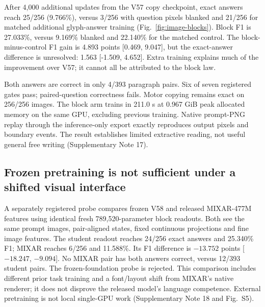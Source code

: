 After 4,000 additional updates from the V57 copy checkpoint, exact answers
reach 25/256 (9.766\%), versus 3/256 with question pixels blanked and 21/256
for matched additional glyph-answer training (Fig.~\ref{fig:image-blocks}).
Block F1 is 27.033\%, versus 9.169\% blanked and 22.140\% for the matched
control. The block-minus-control F1 gain is 4.893 points [0.469, 9.047],
but the exact-answer difference is unresolved: 1.563 [-1.509, 4.652].
Extra training explains much of the improvement over V57; it cannot all be
attributed to the block law.

Both answers are correct in only 4/393 paragraph pairs. Six of seven
registered gates pass; paired-question correctness fails. Motor copying
remains exact on 256/256 images. The block arm trains in 211.0 s at
0.967 GiB peak allocated memory on the same GPU, excluding previous training.
Native prompt-PNG replay through the inference-only export exactly reproduces
output pixels and boundary events. The result establishes limited extractive
reading, not useful general free writing (Supplementary Note 17).


\subsection*{Frozen pretraining is not sufficient under a shifted visual interface}
A separately registered probe compares frozen V58 and released MIXAR-477M\cite{mixar}
features using identical fresh 789,520-parameter block readouts. Both see
the same prompt images, pair-aligned states, fixed continuous projections and
fine image features. The student readout reaches 24/256 exact answers and
25.340\% F1; MIXAR reaches 6/256 and 11.588\%. Its F1 difference is
$-13.752$ points [$-18.247$, $-9.094$]. No MIXAR pair has both answers correct,
versus 12/393 student pairs. The frozen-foundation probe is rejected.
This comparison includes different prior task training and a font/layout
shift from MIXAR's native renderer; it does not disprove the released model's
language competence. External pretraining is not local single-GPU work
(Supplementary Note 18 and Fig.~S5).


